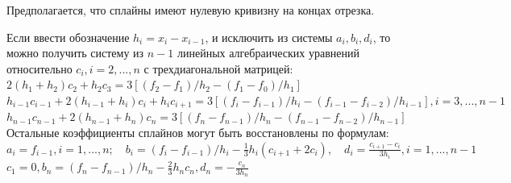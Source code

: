 Предполагается, что сплайны имеют нулевую кривизну на концах отрезка.

Если ввести обозначение $h_i=x_i-x_{i-1}$, и исключить из системы $a_i, b_i, d_i$, то можно получить систему из $n-1$ линейных алгебраических уравнений относительно $c_i, i=2,...,n$ с трехдиагональной матрицей:\\

$2(h_1+h_2)c_2+h_2c_3=3[(f_2-f_1)/h_2-(f_1-f_0)/h_1]$\\
$h_{i-1}c_{i-1}+2(h_{i-1}+h_i)c_i+h_ic_{i+1}=3[(f_i-f_{i-1})/h_i-(f_{i-1}-f_{i-2})/h_{i-1}], i=3,...,n-1$\\
$h_{n-1}c_{n-1}+2(h_{n-1}+h_n)c_n=3[(f_n-f_{n-1})/h_n-(f_{n-1}-f_{n-2})/h_{n-1}]$\\

Остальные коэффициенты сплайнов могут быть восстановлены по формулам:\\

$a_i=f_{i-1}, i=1,...,n; \quad b_i=(f_i-f_{i-1})/h_i-\frac{1}{3}h_i(c_{i+1}+2c_i), \quad d_i=\frac{c_{i+1}-c_i}{3h_i}, i=1,...,n-1$\\
$c_1=0, b_n=(f_n-f_{n-1})/h_n-\frac{2}{3}h_nc_n, d_n=-\frac{c_n}{3h_n}$\\

